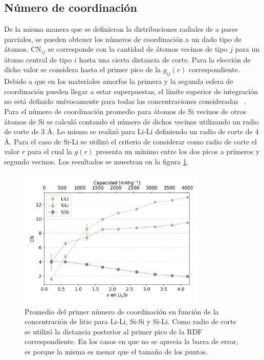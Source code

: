 \subsection{Número de coordinación}

De la misma manera que se definieron la distribuciones radiales de a pares parciales,
se pueden obtener los números de coordinación a un dado tipo de átomos. CN$_{ij}$
se corresponde con la cantidad de átomos vecinos de tipo $j$ para un átomo central
de tipo $i$ hasta una cierta distancia de corte. Para la elección de dicho valor 
se considera hasta el primer pico de la $g_{ij}(r)$ correspondiente. Debido a que 
en los materiales amorfos la primera y la segunda esfera de coordinación pueden 
llegar a estar superpuestas, el límite superior de integración no está definido 
unívocamente para todas las concentraciones consideradas ~\cite{lamparter1995}.
Para el número de coordinación promedio para átomos de Si vecinos de otros átomos 
de Si se calculó contando el número de dichos vecinos utilizando un radio de 
corte de 3 \AA. Lo mismo se realizó para Li-Li definiendo un radio de corte de 
4 \AA. Para el caso de Si-Li se utilizó el criterio de considerar como radio de 
corte el valor $r$ para el cual la $g(r)$ presenta un mínimo entre los dos picos
a primeros y segundo vecinos. Los resultados se muestran en la figura 
\ref{fig:cn1}.
\begin{figure}[th]
    \centering
    \includegraphics[width=0.8\textwidth]{Silicio/caracterizacion/resultados/cn/cn.png}
    \caption{Promedio del primer número de coordinación en función de la 
    concentración de litio para Li-Li, Si-Si y Si-Li. Como radio de corte se 
    utilizó la distancia posterior al primer pico de la RDF correspondiente. En 
    los casos en que no se aprecia la barra de error, es porque la misma es menor 
    que el tamaño de los puntos.}
    \label{fig:cn1}
\end{figure}

